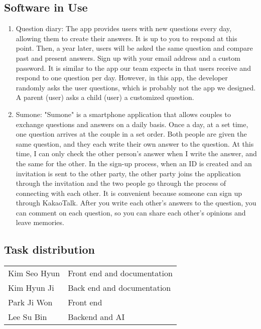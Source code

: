 \documentclass[conference]{IEEEtran}
\begin{document}
\subsection{Software in Use}
    \begin{enumerate}
        \item Question diary:
        The app provides users with new questions every day, allowing them to create their answers. It is up to you to respond at this point. Then, a year later, users will be asked the same question and compare past and present answers. Sign up with your email address and a custom password. It is similar to the app our team expects in that users receive and respond to one question per day. However, in this app, the developer randomly asks the user questions, which is probably not the app we designed. A parent (user) asks a child (user) a customized question.
        \item Sumone:
        "Sumone" is a smartphone application that allows couples to exchange questions and answers on a daily basis. Once a day, at a set time, one question arrives at the couple in a set order. Both people are given the same question, and they each write their own answer to the question. At this time, I can only check the other person's answer when I write the answer, and the same for the other. In the sign-up process, when an ID is created and an invitation is sent to the other party, the other party joins the application through the invitation and the two people go through the process of connecting with each other. It is convenient because someone can sign up through KakaoTalk. After you write each other's answers to the question, you can comment on each question, so you can share each other's opinions and leave memories.
    \end{enumerate}

\subsection{Task distribution}
\begin{table}[H]
    \centering
    \begin{tabular}{m{3cm}|m{4cm}}
    \toprule
    Kim Seo Hyun & Front end and documentation \\
    Kim Hyun Ji & Back end and documentation\\
    Park Ji Won & Front end\\
    Lee Su Bin & Backend and AI\\
    \bottomrule
    \end{tabular}
    \end{table}
\end{document}
